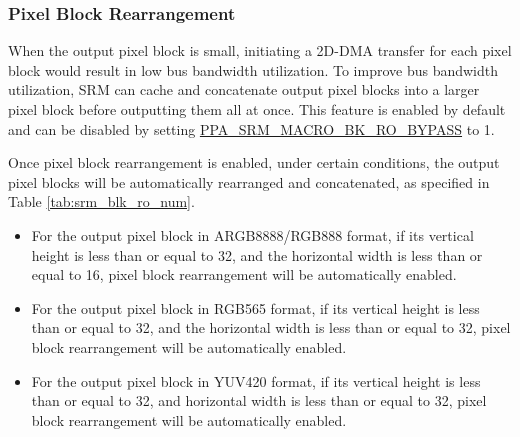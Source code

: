 \documentclass[main\_\_EN.tex]{subfiles}
\begin{document}
\subsubsection{Pixel Block Rearrangement}

When the output pixel block is small, initiating a 2D-DMA transfer for each pixel block would result in low bus bandwidth utilization. To improve bus bandwidth utilization, SRM can cache and concatenate output pixel blocks into a larger pixel block before outputting them all at once. This feature is enabled by default and can be disabled by setting \hyperref[fielddesc:PPASRMMACROBKROBYPASS]{PPA\_SRM\_MACRO\_BK\_RO\_BYPASS} to 1.

Once pixel block rearrangement is enabled, under certain conditions, the output pixel blocks will be automatically rearranged and concatenated, as specified in Table \ref{tab:srm_blk_ro_num}.

\begin{itemize}
    \item For the output pixel block in ARGB8888/RGB888 format, if its vertical height is less than or equal to 32, and the horizontal width is less than or equal to 16, pixel block rearrangement will be automatically enabled.
    \item For the output pixel block in RGB565 format, if its vertical height is less than or equal to 32, and the horizontal width is less than or equal to 32, pixel block rearrangement will be automatically enabled.
    \item For the output pixel block in YUV420 format, if its vertical height is less than or equal to 32, and horizontal width is less than or equal to 32, pixel block rearrangement will be automatically enabled.
\end{itemize}
\end{document}
